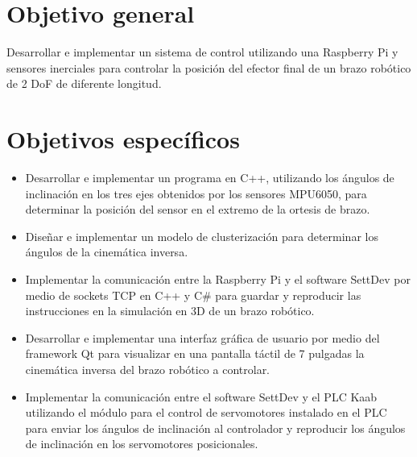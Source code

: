 \section{Objetivo general}

Desarrollar e implementar un sistema de control utilizando una Raspberry Pi y sensores inerciales para controlar la posición del efector final de un brazo robótico de 2 DoF de diferente longitud.

\newpage
\section{Objetivos específicos}
\begin{itemize}
	
	\item Desarrollar e implementar un programa en C++, utilizando los ángulos de inclinación en los tres ejes obtenidos por los sensores MPU6050, para determinar la posición del sensor en el extremo de la ortesis de brazo.
	
	\item Diseñar e implementar un modelo de clusterización para determinar los ángulos de la cinemática inversa.
	
	\item Implementar la comunicación entre la Raspberry Pi y el software SettDev por medio de sockets TCP en C++ y C\# para guardar y reproducir las instrucciones en la simulación en 3D de un brazo robótico.
	
	\item Desarrollar e implementar una interfaz gráfica de usuario por medio del framework Qt para visualizar en una pantalla táctil de 7 pulgadas la cinemática inversa del brazo robótico a controlar.
	
	\item Implementar la comunicación entre el software SettDev y el PLC Kaab utilizando el módulo para el control de servomotores instalado en el PLC para enviar los ángulos de inclinación al controlador y reproducir los ángulos de inclinación en los servomotores posicionales.
	
\end{itemize}